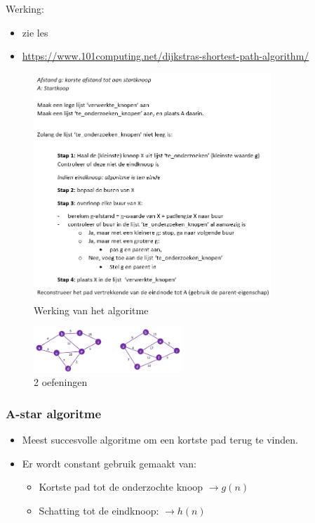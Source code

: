 \documentclass{article}
\begin{document}
Werking: 

\begin{itemize}
    \item zie les
    \item \url{https://www.101computing.net/dijkstras-shortest-path-algorithm/}
\end{itemize}

\begin{figure}[H]
    \centering
    \includegraphics[width=0.8\textwidth]{dijkstra-algoritme.png}
    \caption{Werking van het algoritme}
\end{figure}

\begin{figure}[H]
    \centering
    \includegraphics[width=0.5\textwidth]{dijkstra-oef.png}
    \caption{2 oefeningen}
\end{figure}

\subsubsection{A-star algoritme}


\begin{itemize}
    \item Meest succesvolle algoritme om een kortste pad terug te vinden. 
    \item Er wordt constant gebruik gemaakt van:
    \begin{itemize}
        \item Kortste pad tot de onderzochte knoop $\rightarrow g(n)$
        \item Schatting tot de eindknoop: $\rightarrow h(n)$
    \end{itemize}
\end{itemize}
\end{document}
